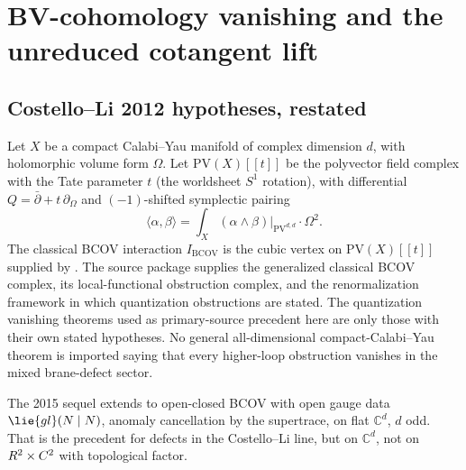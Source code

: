 %

\section*{BV-cohomology vanishing and the unreduced cotangent lift}

\subsection*{Costello--Li 2012 hypotheses, restated}

\begin{stmt}\label{stmt:costello-li-2012-restated}
  Let $X$ be a compact Calabi--Yau manifold of complex dimension $d$,
  with holomorphic volume form $\Omega$. Let $\mathrm{PV}(X)[[t]]$ be
  the polyvector field complex with the Tate parameter $t$ (the
  worldsheet $S^1$ rotation), with differential
  $Q=\bar\partial+t\,\partial_\Omega$ and $(-1)$-shifted symplectic
  pairing
  $$\langle \alpha,\beta\rangle
    =\int_X (\alpha\wedge\beta)\big|_{\mathrm{PV}^{d,d}}\cdot\Omega^2.$$
  The classical BCOV interaction $I_{\mathrm{BCOV}}$ is the cubic
  vertex on $\mathrm{PV}(X)[[t]]$ supplied by
  \cite{costello-li-quantum-bcov}.  The source package supplies the
  generalized classical BCOV complex, its local-functional obstruction
  complex, and the renormalization framework in which quantization
  obstructions are stated.  The quantization vanishing theorems used as
  primary-source precedent here are only those with their own stated
  hypotheses.  No general all-dimensional compact-Calabi--Yau theorem
  is imported saying that every
  higher-loop obstruction vanishes in the mixed brane-defect sector.
\end{stmt}

The 2015 sequel \cite{costello-li-open-closed-bcov} extends to
open-closed BCOV with open gauge data $\lie{gl}(N\mid N)$, anomaly
cancellation by the supertrace, on flat $\mathbb C^d$, $d$ odd. That
is the precedent for defects in the Costello--Li line, but on
$\mathbb C^d$, not on $R^2\times C^2$ with topological factor.

